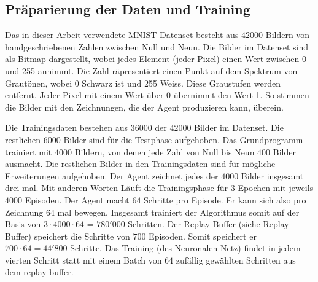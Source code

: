 \subsection*{Präparierung der Daten und Training}
Das in dieser Arbeit verwendete MNIST Datenset besteht aus $42000$ Bildern von
handgeschriebenen Zahlen zwischen Null und Neun. Die Bilder im Datenset sind als
Bitmap dargestellt, wobei jedes Element (jeder Pixel) einen Wert zwischen $0$ und
255 annimmt. Die Zahl räpresentiert einen Punkt auf dem Spektrum von Grautönen,
wobei 0 Schwarz ist und 255 Weiss. Diese Graustufen werden entfernt. Jeder Pixel
mit einem Wert über 0 übernimmt den Wert 1. So stimmen die Bilder mit den
Zeichnungen, die der Agent produzieren kann, überein.

Die Trainingsdaten bestehen aus $36000$ der $42000$ Bilder im Datenset. Die
restlichen $6000$ Bilder sind für die Testphase aufgehoben. Das Grundprogramm
trainiert mit $4000$ Bildern, von denen jede Zahl von Null bis Neun $400$ Bilder
ausmacht. Die restlichen Bilder in den Trainingsdaten sind für mögliche
Erweiterungen aufgehoben. Der Agent zeichnet jedes der $4000$ Bilder insgesamt
drei mal. Mit anderen Worten Läuft die Trainingsphase für $3$ Epochen mit
jeweils $4000$ Episoden. Der Agent macht $64$ Schritte pro Episode. Er kann sich
also pro Zeichnung $64$ mal bewegen. Insgesamt trainiert der Algorithmus somit
auf der Basis von $3\cdot4000\cdot64$ = $780'000$ Schritten. Der Replay Buffer
(siehe Replay Buffer) speichert die Schritte von $700$ Episoden. Somit speichert  %
er $700\cdot64 = 44'800$ Schritte. Das Training (des Neuronalen Netz) findet in
jedem vierten Schritt statt mit einem Batch von $64$ zufällig gewählten
Schritten aus dem replay buffer.



    


